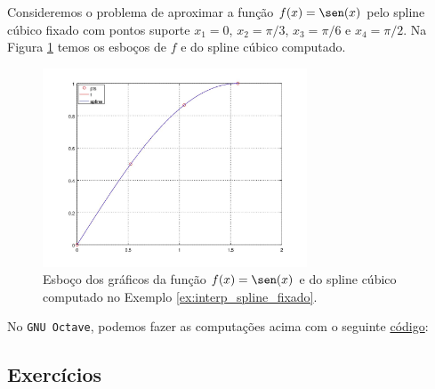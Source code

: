 \begin{ex}\label{ex:interp_spline_fixado}
  Consideremos o problema de aproximar a função $f(x)=\sen(x)$ pelo spline cúbico fixado com pontos suporte $x_1=0$, $x_2=\pi/3$, $x_3=\pi/6$ e $x_4=\pi/2$. Na Figura \ref{fig:interp_spline_fixado} temos os esboços de $f$ e do spline cúbico computado.

  \begin{figure}[h!]
    \centering
    \includegraphics[width=0.7\textwidth]{./cap_interp/dados/ex_interp_spline_fixado/fig_interp_spline_fixado}
    \caption{Esboço dos gráficos da função $f(x)=\sen(x)$ e do spline cúbico computado no Exemplo \ref{ex:interp_spline_fixado}.}
    \label{fig:interp_spline_fixado}
  \end{figure}

\ifisoctave
No \verb+GNU Octave+, podemos fazer as computações acima com o seguinte \href{https://github.com/phkonzen/notas/blob/master/src/MatematicaNumerica/cap_interp/dados/ex_interp_spline_fixado/ex_interp_spline_fixado.m}{código}:

\fi
\end{ex}

\subsection*{Exercícios}

\emconstrucao
